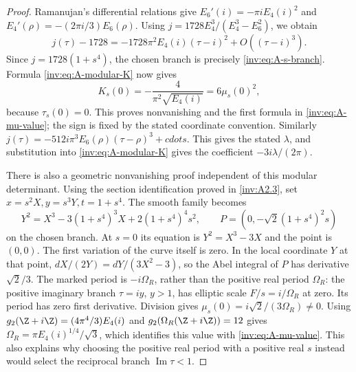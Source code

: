 \begin{proof}
Ramanujan's differential relations give
$E_6'(i)=-\pi i E_4(i)^2$ and
$E_4'(\rho)=-(2\pi i/3)E_6(\rho)$.
Using $j=1728E_4^3/(E_4^3-E_6^2)$, we obtain
\[
j(\tau)-1728=-1728\pi^2E_4(i)(\tau-i)^2+O((\tau-i)^3).
\]
Since $j=1728(1+s^4)$, the chosen branch is precisely
\eqref{inv:eq:A-s-branch}.  Formula \eqref{inv:eq:A-modular-K} now gives
\[
K_s(0)=-\frac4{\pi^2\sqrt{E_4(i)}}=6\mu_s(0)^2,
\]
because $\tau_s(0)=0$.  This proves nonvanishing and the first
formula in \eqref{inv:eq:A-mu-value}; the sign is fixed by the stated
coordinate convention.  Similarly
$j(\tau)=-512i\pi^3E_6(\rho)(\tau-\rho)^3+cdots$.
This gives the stated $\lambda$, and substitution into
\eqref{inv:eq:A-modular-K} gives the coefficient $-3i\lambda/(2\pi)$.

There is also a geometric nonvanishing proof independent of this
modular determinant.  Using the section identification proved in
\ref{inv:A2.3}, set $x=s^2X,y=s^3Y,t=1+s^4$.  The smooth family becomes
\[
Y^2=X^3-3(1+s^4)^3X+2(1+s^4)^4s^2,
\qquad P=(0,-\sqrt2(1+s^4)^2s)
\]
on the chosen branch.  At $s=0$ its equation is
$Y^2=X^3-3X$ and the point is $(0,0)$.  The first variation of the
curve itself is zero.  In the local coordinate $Y$ at that point,
$dX/(2Y)=dY/(3X^2-3)$, so the Abel integral of $P$ has derivative
$\sqrt2/3$.  The marked period is $-i\Omega_R$, rather than the
positive real period $\Omega_R$: the positive imaginary branch
$\tau=iy$, $y>1$, has elliptic scale $F/s=i/\Omega_R$ at zero.
Its period has zero first derivative.  Division gives
$\mu_s(0)=i\sqrt2/(3\Omega_R)\ne0$.
Using $g_2(\Z+i\Z)=(4\pi^4/3)E_4(i)$ and
$g_2(\Omega_R(\Z+i\Z))=12$ gives
$\Omega_R=\pi E_4(i)^{1/4}/\sqrt3$, which identifies this value
with \eqref{inv:eq:A-mu-value}.  This also explains why choosing the
positive real period with a positive real $s$ instead would select
the reciprocal branch $\operatorname{Im}\tau<1$.


\end{proof}
